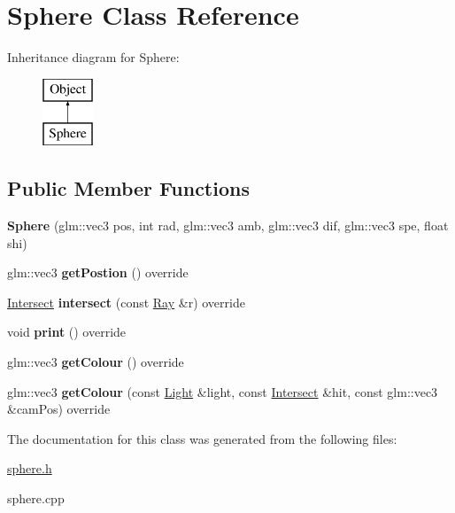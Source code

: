 \hypertarget{class_sphere}{}\section{Sphere Class Reference}
\label{class_sphere}
Inheritance diagram for Sphere\+:\begin{figure}[H]
\begin{center}
\leavevmode
\includegraphics[height=2.000000cm]{class_sphere}
\end{center}
\end{figure}
\subsection*{Public Member Functions}
\begin{DoxyCompactItemize}
\item 
\mbox{\label{class_sphere_ac5331c3b7a05c78676a39ea7d30791ca}} 
{\bfseries Sphere} (glm\+::vec3 pos, int rad, glm\+::vec3 amb, glm\+::vec3 dif, glm\+::vec3 spe, float shi)
\item 
\mbox{\label{class_sphere_a6e2f290f9632e8da3d8dd90dc74997ac}} 
glm\+::vec3 {\bfseries get\+Postion} () override
\item 
\mbox{\label{class_sphere_a8d2ea6e36b5c23330e08861bb723e2a4}} 
\mbox{\hyperlink{struct_intersect}{Intersect}} {\bfseries intersect} (const \mbox{\hyperlink{struct_ray}{Ray}} \&r) override
\item 
\mbox{\label{class_sphere_a95537121c5308b7b250f4a53171303ef}} 
void {\bfseries print} () override
\item 
\mbox{\label{class_sphere_abc6455e04b563fb57b91f12183fa4d18}} 
glm\+::vec3 {\bfseries get\+Colour} () override
\item 
\mbox{\label{class_sphere_a0ce51c06baaea1c35129b17b5132ff58}} 
glm\+::vec3 {\bfseries get\+Colour} (const \mbox{\hyperlink{class_light}{Light}} \&light, const \mbox{\hyperlink{struct_intersect}{Intersect}} \&hit, const glm\+::vec3 \&cam\+Pos) override
\end{DoxyCompactItemize}


The documentation for this class was generated from the following files\+:\begin{DoxyCompactItemize}
\item 
\mbox{\hyperlink{sphere_8h}{sphere.\+h}}\item 
sphere.\+cpp\end{DoxyCompactItemize}
